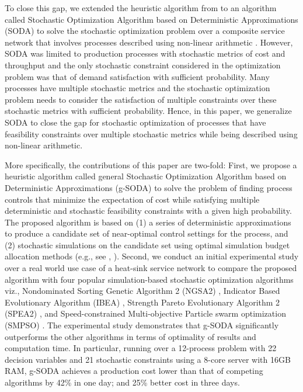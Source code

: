 \documentclass[a4paper, 12pt]{article} %
\begin{document}
To close this gap, we extended the heuristic algorithm from \cite{Krishnamoorthy2015} to an algorithm called Stochastic Optimization Algorithm based on Deterministic Approximations (SODA) to solve the stochastic optimization problem over a composite service network that involves processes described using non-linear arithmetic \cite{GMU-CS-TR-2017-3}.
However, SODA was limited to production processes with stochastic metrics of cost and throughput and the only stochastic constraint considered in the optimization problem was that of demand satisfaction with sufficient probability. Many processes have multiple stochastic metrics and the stochastic optimization problem needs to consider the satisfaction of multiple constraints over these stochastic metrics with sufficient probability. 
Hence, in this paper, we generalize SODA to close the gap for stochastic optimization of processes that have feasibility constraints over multiple stochastic metrics while being described using non-linear arithmetic.

More specifically, the contributions of this paper are two-fold:
First, we propose a heuristic algorithm called general Stochastic Optimization Algorithm based on Deterministic Approximations (g-SODA) to solve the problem of finding process controls that minimize the expectation of cost while satisfying multiple deterministic and stochastic feasibility constraints with a given high probability. 
The proposed algorithm is based on (1) a series of deterministic approximations to produce a candidate set of near-optimal control settings for the process, and (2) stochastic simulations on the candidate set using optimal simulation budget allocation methods (e.g., see \cite{Chen2011}, \cite{Lee2012OCBACO}).  
Second, we conduct an initial experimental study over a real world use case of a heat-sink service network to compare the proposed algorithm with four popular simulation-based stochastic optimization algorithms viz., Nondominated Sorting Genetic Algorithm 2 (NGSA2) \cite{ngsa2}, Indicator Based Evolutionary Algorithm (IBEA) \cite{ibea}, Strength Pareto Evolutionary Algorithm 2 (SPEA2) \cite{spea2}, and Speed-constrained Multi-objective Particle swarm optimization (SMPSO) \cite{NDG09}.
 The experimental study demonstrates that g-SODA significantly outperforms the other algorithms in terms of optimality of results and computation time. In particular, 
running over a 12-process problem with 22 decision variables and 21 stochastic constraints using a 8-core server with 16GB RAM, g-SODA achieves a production cost lower than that of competing algorithms by 42\% in one day; and 25\% better cost in three days.
\end{document}
